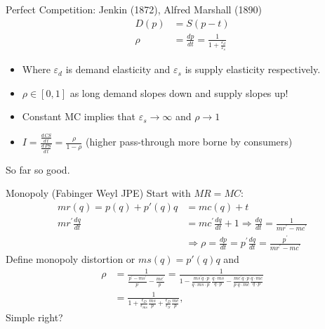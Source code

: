 \begin{frame}{Perfect Competition: Jenkin (1872), Alfred Marshall (1890)}
\begin{align*}
D(p) &= S(p-t)\\
\rho&= \frac{d p}{d t} = \frac{1}{1 + \frac{\varepsilon_d}{\varepsilon_s}}
\end{align*}

\begin{itemize}
\item Where $\varepsilon_d$ is \alert{demand elasticity} and $\varepsilon_s$ is \alert{supply elasticity} respectively.\\
\item $\rho \in [0,1]$ as long demand slopes down and supply slopes up!
\item Constant MC implies that $\varepsilon_s \rightarrow \infty$ and $\rho \rightarrow 1$
\item $I = \frac{\frac{d\, CS}{d\, t}}{\frac{d\, PS}{d\, t}} = \frac{\rho}{1-\rho}$ (higher pass-through more borne by consumers)
\end{itemize}
So far so good.
\end{frame}


\begin{frame}{Monopoly (Fabinger Weyl JPE)}
Start with $MR = MC$:
\begin{align*}
mr(q) = p(q) + p'(q) q &= mc(q) + t\\
m r^{\prime} \frac{d q}{d t} & =m c^{\prime} \frac{d q}{d t}+1 \Rightarrow \frac{d q}{d t}=\frac{1}{m r^{\prime}-m c^{\prime}} \\
& \Rightarrow \rho=\frac{d p}{d t}=p^{\prime} \frac{d q}{d t}=\frac{p^{\prime}}{m r^{\prime}-m c^{\prime}}
\end{align*}
Define monopoly distortion or $ms(q) = p'(q) q$ and
\begin{align*}
\rho & =\frac{1}{\frac{p^{\prime}-m s^{\prime}}{p^{\prime}}-\frac{m c^{\prime}}{p^{\prime}}}=\frac{1}{1-\frac{m s^{\prime} q \cdot p}{q \cdot m s \cdot p^{\prime}} \frac{q \cdot m s}{q \cdot p}-\frac{m c^{\prime} q \cdot p}{p^{\prime} q \cdot m c} \frac{q \cdot m c}{q \cdot p}} \\
& =\frac{1}{1+\frac{\epsilon_D}{\epsilon_{m s}} \frac{m s}{p}+\frac{\epsilon_D}{\epsilon_S} \frac{m c}{p}},
\end{align*}
Simple right?
\end{frame}


